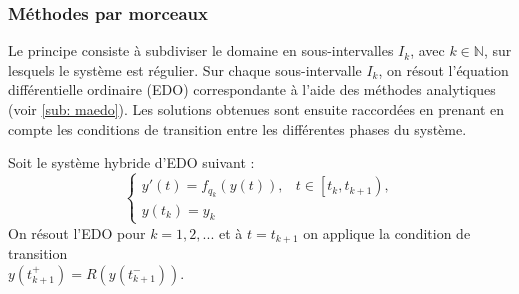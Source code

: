 \documentclass[12pt, oneside]{report} %
\theoremstyle{definition}
\theoremstyle{remark}
\begin{document}
	
	\subsubsection{Méthodes par morceaux}
Le principe consiste à subdiviser le domaine en sous-intervalles $I_k$, avec $k \in \mathbb{N}$, sur lesquels le système est régulier.  
Sur chaque sous-intervalle $I_k$, on résout l’équation différentielle ordinaire (EDO) correspondante à l’aide des méthodes analytiques (voir \eqref{sub: maedo}).  
Les solutions obtenues sont ensuite raccordées en prenant en compte les conditions de transition entre les différentes phases du système.

	
	Soit le système hybride d'EDO suivant : 
	\begin{equation}
		\begin{cases}
			y'(t) = {f}_{q_k}(y(t)), & t \in \left[ t_k, t_{k+1}\right), \\
			y(t_k) = y_k
		\end{cases}
	\end{equation}
	On résout l'EDO pour $k = 1, 2, ...$ et à $t = t_{k+1}$ on applique la condition de transition \\$y(t^+_{k+1}) = R(y(t^-_{k+1}))$.
	
\end{document}
